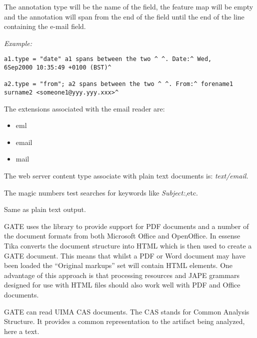 The annotation type will be the name of the field, the feature map
will be empty and the annotation will span from the end of the
field until the end of the line containing the e-mail field.

{\em Example:}

\small
\begin{small}
\begin{verbatim}
a1.type = "date" a1 spans between the two ^ ^. Date:^ Wed,
6Sep2000 10:35:49 +0100 (BST)^

a2.type = "from"; a2 spans between the two ^ ^. From:^ forename1
surname2 <someone1@yyy.yyy.xxx>^
\end{verbatim}
\end{small}
\nnormalsize

The extensions associated with the email reader are:
\begin{itemize}
\item
eml
\item
email
\item
mail
\end{itemize}

The web server content type associate with plain text documents
is: {\em text/email.}

The magic numbers test searches for keywords like {\em
Subject:},etc.


Same as plain text output.


GATE uses the  library to provide
support for PDF documents and a number of the document formats from both
Microsoft Office and OpenOffice. In essense Tika converts the document structure
into HTML which is then used to create a GATE document. This means that whilst
a PDF or Word document may have been loaded the ``Original markups'' set will
contain HTML elements. One advantage of this approach is that processing
resources and JAPE grammars designed for use with HTML files should also
work well with PDF and Office documents.

GATE can read UIMA CAS documents. The CAS stands for Common Analysis
Structure. It provides a common representation to the artifact being
analyzed, here a text.

